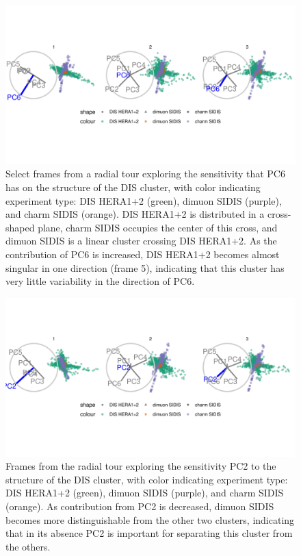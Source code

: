 \documentclass{monashthesis}
\begin{document}
\begin{figure}

{\centering \includegraphics[width=1\linewidth,]{./figures_from_script/ch3_fig6_DIS_better_pc6} 

}

\caption{Select frames from a radial tour exploring the sensitivity that PC6 has on the structure of the DIS cluster, with color indicating experiment type: DIS HERA1+2 (green), dimuon SIDIS (purple), and charm SIDIS (orange). DIS HERA1+2 is distributed in a cross-shaped plane, charm SIDIS occupies the center of this cross, and dimuon SIDIS is a linear cluster crossing DIS HERA1+2. As the contribution of PC6 is increased, DIS HERA1+2 becomes almost singular in one direction (frame 5), indicating that this cluster has very little variability in the direction of PC6.}\label{fig:ch3fig6}
\end{figure}

\begin{figure}

{\centering \includegraphics[width=1\linewidth,]{./figures_from_script/ch3_fig7_DIS_worse_pc2} 

}

\caption{Frames from the radial tour exploring the sensitivity PC2 to the structure of the DIS cluster, with color indicating experiment type: DIS HERA1+2 (green), dimuon SIDIS (purple), and charm SIDIS (orange). As contribution from PC2 is decreased, dimuon SIDIS becomes more distinguishable from the other two clusters, indicating that in its absence PC2 is important for separating this cluster from the others.}\label{fig:ch3fig7}
\end{figure}
\end{document}
